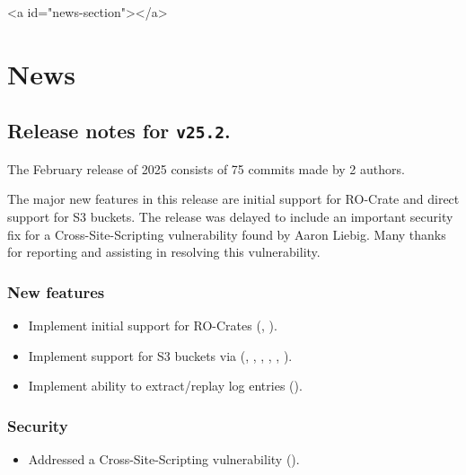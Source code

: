 \ifdefined\HCode
\begin{html}
<a id="news-section"></a>
\end{html}
\fi
\chapter*{News}

\section*{Release notes for \texttt{v25.2}.}

  The February release of 2025 consists of 75 commits made by 2 authors.

  The major new features in this release are initial support for RO-Crate
  and direct support for S3 buckets.  The release was delayed to include an
  important security fix for a Cross-Site-Scripting vulnerability found
  by Aaron Liebig.  Many thanks for reporting and assisting in resolving
  this vulnerability.

\subsection*{New features}
\begin{itemize}
\item{Implement initial support for RO-Crates
    (,
    ).}
\item{Implement support for S3 buckets via 
    (,
    ,
    ,
    ,
    ,
    ).}
\item{Implement ability to extract/replay log entries
    ().}
\end{itemize}

\subsection*{Security}

\begin{itemize}
\item{Addressed a Cross-Site-Scripting vulnerability
    ().}
\end{itemize}

